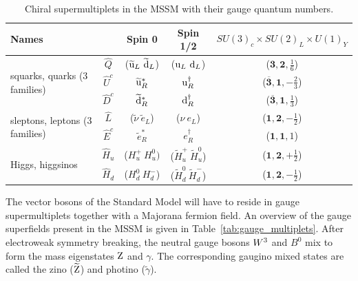 \begin{table}[t]
  \caption{Chiral supermultiplets in the MSSM with their gauge quantum numbers.}
  \begin{center}
  \begin{tabular}{ l c | c c c }
    \toprule
    \multicolumn{2}{l}{Names} & Spin 0 & Spin 1/2 & $SU(3)_c \times SU(2)_L \times U(1)_Y$ \\ 
    \midrule
    \multirow{3}{3cm}{squarks, quarks (3 families)} & $\widehat{Q}$ & ($\widetilde{\mathrm{u}}_L \
\widetilde{\mathrm{d}}_L$) & ($\cPqu_L \ \cPqd_L$) & ($\mathbf{3}, \mathbf{2}, \frac{1}{6}$)  \\[1ex] 
    & $\widehat{U}^c$ & $\widetilde{\mathrm{u}}_R^*$ & $\mathrm{u}_R^\dagger$ & ($\mathbf{\overline{3}},
\mathbf{1}, -\frac{2}{3}$)  \\[1ex]
    & $\widehat{D}^c$ & $\widetilde{\mathrm{d}}_R^*$ & $\mathrm{d}_R^\dagger$ & ($\mathbf{\overline{3}},
\mathbf{1}, \frac{1}{3}$)  \\ 
    \midrule
    \multirow{2}{3cm}{sleptons, leptons (3 families)} & $\widehat{L}$ & ($\widetilde{\nu} \
\widetilde{e}_L$) & ($\nu \ e_L$) & ($\mathbf{1}, \mathbf{2}, -\frac{1}{2}$) \\[1ex] 
    & $\widehat{E}^c$ & $\widetilde{e}_R^*$ & $e_R^\dagger$ & ($\mathbf{1}, \mathbf{1}, 1$)  \\ 
    \midrule
    \multirow{2}{3cm}{Higgs, higgsinos} & $\widehat{H}_u$ & ($H_u^+ \ H_u^0)$ &
($\widetilde{H}_u^+ \ \widetilde{H}_u^0$) & ($\mathbf{1}, \mathbf{2}, +\frac{1}{2}$) \\[1ex] 
    & $\widehat{H}_d$ & ($H_d^0 \ H_d^-$) & ($\widetilde{H}_d^0 \ \widetilde{H}_d^-$)  &
($\mathbf{1}, \mathbf{2}, -\frac{1}{2}$) \\
  \bottomrule
  \end{tabular}
  \end{center}
  \label{tab:chiral_multiplets}
\end{table}

The vector bosons of the Standard Model will have to reside in gauge supermultiplets together with
a Majorana fermion field. An overview of the gauge superfields present in the MSSM is given in
Table~\ref{tab:gauge_multiplets}. 
After electroweak symmetry breaking, the neutral gauge bosons
$W^3$ and $B^0$ mix to form the mass eigenstates $\mathrm{Z}$ and $\gamma$. The corresponding gaugino
mixed states are called the zino ($\widetilde{\mathrm{Z}}$) and photino ($\widetilde{\gamma}$). 

